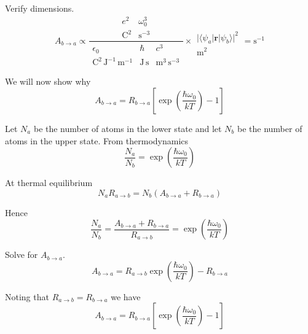 Verify dimensions.
\begin{equation*}
A_{b\rightarrow a}\propto
\frac{
\begin{matrix}
e^2 & \omega_0^3
\\
\text{C}^2 & \text{s}^{-3}
\end{matrix}
}
{
\begin{matrix}
\epsilon_0 & \hbar & c^3
\\
\text{C}^2\,\text{J}^{-1}\,\text{m}^{-1}
& \text{J}\,\text{s}
& \text{m}^3\,\text{s}^{-3}
\end{matrix}
}
\times
\begin{matrix}
\\
\bigl|\langle\psi_a|\mathbf r|\psi_b\rangle\bigr|^2
\\
\text{m}^2
\end{matrix}
=\text{s}^{-1}
\end{equation*}

We will now show why
\begin{equation*}
A_{b\rightarrow a}=R_{b\rightarrow a}
\left[\exp\left(\frac{\hbar\omega_0}{kT}\right)-1\right]
\end{equation*}

Let $N_a$ be the number of atoms in the lower state and let $N_b$ be
the number of atoms in the upper state.
From thermodynamics
\begin{equation*}
\frac{N_a}{N_b}=\exp\left(\frac{\hbar\omega_0}{kT}\right)
\end{equation*}

At thermal equilibrium
\begin{equation*}
N_aR_{a\rightarrow b}=N_b(A_{b\rightarrow a}+R_{b\rightarrow a})
\end{equation*}

Hence
\begin{equation*}
\frac{N_a}{N_b}=\frac{A_{b\rightarrow a}+R_{b\rightarrow a}}{R_{a\rightarrow b}}
=\exp\left(\frac{\hbar\omega_0}{kT}\right)
\end{equation*}

Solve for $A_{b\rightarrow a}$.
\begin{equation*}
A_{b\rightarrow a}=R_{a\rightarrow b}\exp\left(\frac{\hbar\omega_0}{kT}\right)-R_{b\rightarrow a}
\end{equation*}

Noting that $R_{a\rightarrow b}=R_{b\rightarrow a}$ we have
\begin{equation*}
A_{b\rightarrow a}
=R_{b\rightarrow a}\left[\exp\left(\frac{\hbar\omega_0}{kT}\right)-1\right]
\end{equation*}


